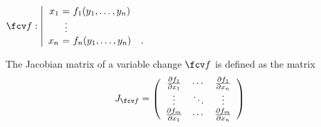 \begin{frame}
\hfil $
\fcv f:\left|\begin{array}{r@{~}c@{~}l}
x_1 &=& f_1( y_1, \dots, y_n)\\
&\vdots&\\
x_n &=&f_n( y_1, \dots, y_n) \quad .
\end{array}\right.
$
\begin{definition}
The Jacobian matrix of a variable change $\fcv f$ is defined as the matrix 
\[
J_{\fcv f}=\left( \begin{array}{ccc} \frac{\partial f_1}{\partial x_1} & \cdots & \frac{\partial f_1}{\partial x_n} \\ \vdots & \ddots & \vdots \\ \frac{\partial f_m}{\partial x_1} & \cdots & \frac{\partial f_m}{\partial x_n} \end{array}\right) 
\]
\end{definition}


\end{frame}